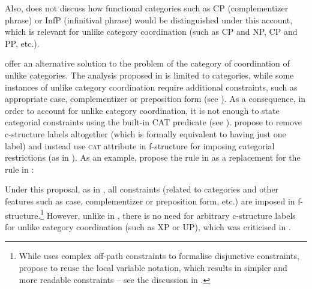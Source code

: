 \documentclass[output=paper]{../langscibook}
\begin{document}
Also, \citet{dalr:17} does not discuss how functional categories
such as CP (complementizer phrase) or InfP (infinitival phrase) would
be distinguished under this account, which is relevant for unlike
category coordination (such as CP and NP, CP and PP, etc.).

\citet{PP2021} offer an alternative solution to the problem
of the category of coordination of unlike categories. The analysis proposed in \citet{dalr:17} is limited to
categories, while some instances of unlike category
coordination require additional constraints, such as appropriate case,
complementizer or preposition form (see ). As a consequence, in order to
account for unlike category coordination, it is not enough to
state categorial constraints using the built-in \textsc{CAT}
predicate (see ). \citet{PP2021} propose to remove c-structure
labels altogether (which is formally equivalent to having just one
label) and instead use \textsc{cat} attribute in f-structure for
imposing categorial restrictions (as in \citet{Patejuk2015}). As an
example, \citet{PP2021} propose the rule in
 as a replacement for the rule in
:
\ea\label{ex:pprim:here}
\\
\hspace*{\fill} \citep[(35)]{PP2021}
\item\label{ex:pprim:basic}
  \hfill\citep[(32)]{PP2021}
\z
Under this proposal, as in \citet{Patejuk2015}, all constraints
(related to categories and other features such as case, complementizer
or preposition form, etc.) are imposed in f-structure.\footnote{While
\citet{Patejuk2015} uses complex off-path constraints to formalise
disjunctive constraints, \citet{PP2021} propose to reuse the
local variable notation, which results in simpler and more readable
constraints – see the discussion in .} However,
unlike in \citet{Patejuk2015}, there is no need for arbitrary c-structure labels for unlike category coordination (such as XP or UP),
which was criticised in \citet{dalr:17}.
\end{document}
